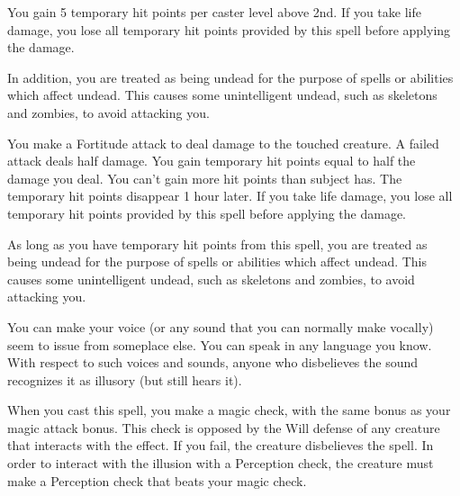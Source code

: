 \spellrng{\rngpers}
\spelldur{\durlong}
\begin{spelleffect}
  You gain 5 temporary hit points  per caster level above 2nd. If you take life damage, you lose all temporary hit points provided by this spell before applying the damage.

  In addition, you are treated as being undead for the purpose of spells or abilities which affect undead. This causes some unintelligent undead, such as skeletons and zombies, to avoid attacking you.
\end{spelleffect}

\begin{spelleffect}
    You make a Fortitude attack to deal damage to the touched creature. A failed attack deals half damage. You gain temporary hit points equal to half the damage you deal. You can't gain more hit points than subject has. The temporary hit points disappear 1 hour later. If you take life damage, you lose all temporary hit points provided by this spell before applying the damage.

  As long as you have temporary hit points from this spell, you are treated as being undead for the purpose of spells or abilities which affect undead. This causes some unintelligent undead, such as skeletons and zombies, to avoid attacking you.
\end{spelleffect}

\spellrng{\rngclose}
\begin{spelleffect}
  You can make your voice (or any sound that you can normally make vocally) seem to issue from someplace else. You can speak in any language you know. With respect to such voices and sounds, anyone who disbelieves the sound recognizes it as illusory (but still hears it).
\end{spelleffect}
\begin{spellnotes}
    When you cast this spell, you make a magic check, with the same bonus as your magic attack bonus. This check is opposed by the Will defense of any creature that interacts with the effect. If you fail, the creature disbelieves the spell. In order to interact with the illusion with a Perception check, the creature must make a Perception check that beats your magic check.
\end{spellnotes}

